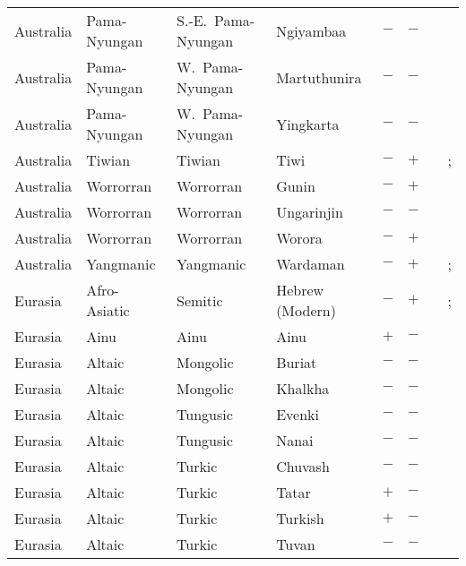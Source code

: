 \begin{landscape}
\begin{longtable}{l>{\raggedright\arraybackslash}p{2.2cm}>{\raggedright}p{2.5cm}>{\raggedright\arraybackslash}p{2.5cm}cc>{\raggedright\arraybackslash}p{3.4cm}>{\raggedright\arraybackslash}p{3.4cm}}
Australia & Pama-Nyungan & S.-E.~Pama-Nyungan & Ngiyambaa & $-$ & $-$ & \citealt{Gil2013} & \citealt{Corbett2013}\\
Australia & Pama-Nyungan & W.~Pama-Nyungan & Martuthunira & $-$ & $-$ & \citealt{Gil2013} & \citealt{Corbett2013}\\
Australia & Pama-Nyungan & W.~Pama-Nyungan & Yingkarta & $-$ & $-$ & \citealt{Gil2013} & \citealt[20]{Dench1998}\\
Australia & Tiwian & Tiwian & Tiwi & $-$ & $+$ & \citealt{Gil2013} & \citealt{Corbett2013}; \citealt[51--52]{Osborne1974}\\
Australia & Worrorran & Worrorran & Gunin & $-$ & $+$ & \citealt{Gil2013} & \citealt[146--149]{McGregor2004}\\
Australia & Worrorran & Worrorran & Ungarinjin & $-$ & $-$ & \citealt{Gil2013} & \citealt[299]{Nichols1992}\\
Australia & Worrorran & Worrorran & Worora & $-$ & $+$ & \citealt{Gil2013} & \citealt[95]{Clendon2000}\\
Australia & Yangmanic & Yangmanic & Wardaman & $-$ & $+$ & \citealt[120]{Merlan1994}& \citealt{Corbett2013}; \citealt[61--63, 241--242]{Merlan1994}\\
Eurasia & Afro-Asiatic & Semitic & Hebrew (Modern) & $-$ & $+$ & \citealt{Gil2013} & \citealt{Corbett2013}; \citealt[51--52, 91, 104, 117--120, 185--198]{Glinert1989}\\
Eurasia & Ainu & Ainu & Ainu & $+$ & $-$ & \citealt{Gil2013} & \citealt{Corbett2013}\\
Eurasia & Altaic & Mongolic & Buriat & $-$ & $-$ & \citealt{Gil2013} & \citealt[110--111, 117--120]{Skribnik2003}\\
Eurasia & Altaic & Mongolic & Khalkha & $-$ & $-$ & \citealt{Gil2013} & \citealt{Corbett2013}\\
Eurasia & Altaic & Tungusic & Evenki & $-$ & $-$ & \citealt{Gil2013} & \citealt{Corbett2013}\\
Eurasia & Altaic & Tungusic & Nanai & $-$ & $-$ & \citealt{Gil2013} & \citealt[297]{Nichols1992}\\
Eurasia & Altaic & Turkic & Chuvash & $-$ & $-$ & \citealt{Gil2013} & \citealt{Corbett2013}\\
Eurasia & Altaic & Turkic & Tatar & $+$ & $-$ & \citealt{Gil2013} & \citealt[29--57]{Poppe1968}\\
Eurasia & Altaic & Turkic & Turkish & $+$ & $-$ & \citealt{Gil2013} & \citealt{Corbett2013}\\
Eurasia & Altaic & Turkic & Tuvan & $-$ & $-$ & \citealt{Gil2013} & \citealt[297]{Nichols1992}\\

\end{longtable}
\end{landscape}
